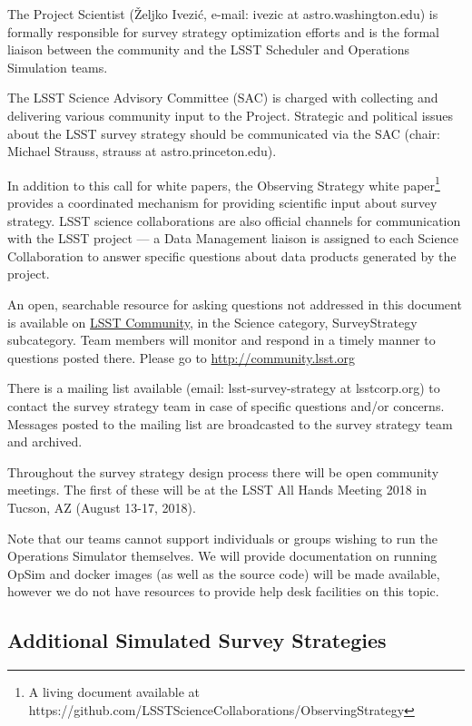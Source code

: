 \documentclass[DM,lsstdraft,toc,usenatbib]{lsstdoc}
\begin{document}
The Project Scientist (\v{Z}eljko Ivezi\'{c}, e-mail: ivezic at astro.washington.edu) is formally responsible for survey strategy optimization efforts and is the formal liaison between the community and the LSST Scheduler and Operations Simulation teams.

The LSST Science Advisory Committee (SAC) is charged with collecting and delivering various community input to the Project. Strategic and political issues about the LSST survey strategy should be communicated via the SAC (chair: Michael Strauss, strauss at astro.princeton.edu).

In addition to this call for white papers, the Observing Strategy white paper\footnote{A living document available at https://github.com/LSSTScienceCollaborations/ObservingStrategy} provides a coordinated mechanism for providing scientific input about survey strategy. LSST science collaborations are also official channels for communication with the LSST project --- a Data Management liaison is assigned to each Science Collaboration to answer specific questions about data products generated by the project.

An open, searchable resource for asking questions not addressed in this document is available on \href{http://community.lsst.org}{LSST Community}, in the Science category, SurveyStrategy subcategory. Team members will monitor and respond in a timely manner to questions posted there. Please go to \url{http://community.lsst.org}

There is a mailing list available (email: lsst-survey-strategy at lsstcorp.org) to contact the survey strategy team in case of specific 
questions and/or concerns. Messages posted to the mailing list are broadcasted to the survey strategy team and archived. 

Throughout the survey strategy design process there will be open community meetings. The first of these will be 
at the LSST All Hands Meeting 2018 in Tucson, AZ (August 13-17, 2018). 

Note that our teams cannot support individuals or groups wishing to run the Operations Simulator themselves. We will provide documentation on running OpSim and docker images (as well as the source code) will be made available, however we do not have resources to provide help desk facilities on this topic. 

\subsection{Additional Simulated Survey Strategies}
\end{document}
